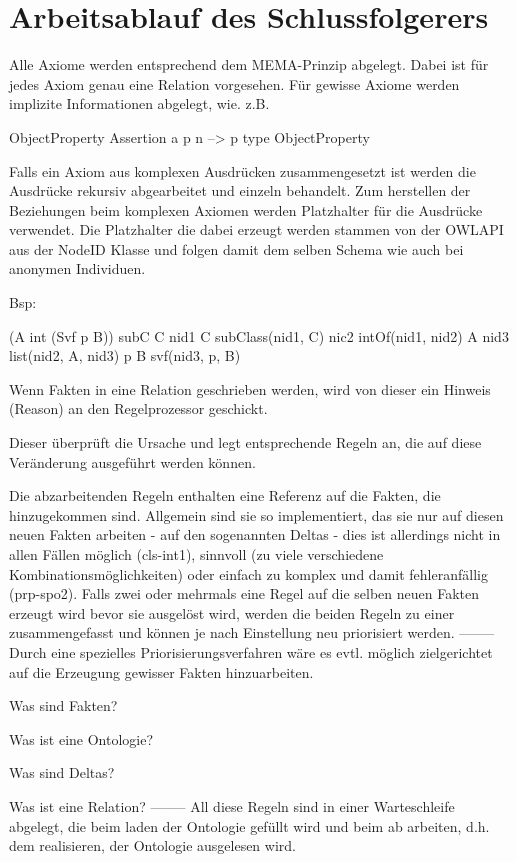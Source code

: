 \section{Arbeitsablauf des Schlussfolgerers}
Alle Axiome werden entsprechend dem MEMA-Prinzip abgelegt. Dabei ist für jedes Axiom genau eine Relation vorgesehen. Für gewisse Axiome werden implizite Informationen abgelegt, wie. z.B.

ObjectProperty Assertion a p n --> p type ObjectProperty

Falls ein Axiom aus komplexen Ausdrücken zusammengesetzt ist werden die Ausdrücke rekursiv abgearbeitet und einzeln behandelt. Zum herstellen der Beziehungen beim komplexen Axiomen werden Platzhalter für die Ausdrücke verwendet. Die Platzhalter die dabei erzeugt werden stammen von der OWLAPI aus der NodeID Klasse und folgen damit dem selben Schema wie auch bei anonymen Individuen.

Bsp:

(A int (Svf p B)) subC C
      nid1             C    subClass(nid1, C)
      nic2                  intOf(nid1, nid2)
 A         nid3             list(nid2, A, nid3)
            p B             svf(nid3, p, B)


Wenn Fakten in eine Relation geschrieben werden, wird von dieser ein Hinweis (Reason) an den Regelprozessor geschickt.

Dieser überprüft die Ursache und legt entsprechende Regeln an, die auf diese Veränderung ausgeführt werden können.

Die abzarbeitenden Regeln enthalten eine Referenz auf die Fakten, die hinzugekommen sind. Allgemein sind sie so implementiert, das sie nur auf diesen neuen Fakten arbeiten -  auf den sogenannten Deltas - dies ist allerdings nicht in allen Fällen möglich (cls-int1), sinnvoll (zu viele verschiedene Kombinationsmöglichkeiten) oder einfach zu komplex und damit fehleranfällig (prp-spo2). Falls zwei oder mehrmals eine Regel auf die selben neuen Fakten erzeugt wird bevor sie ausgelöst wird, werden die beiden Regeln zu einer zusammengefasst und können je nach Einstellung neu priorisiert werden.
--------
Durch eine spezielles Priorisierungsverfahren wäre es evtl. möglich zielgerichtet auf die Erzeugung gewisser Fakten hinzuarbeiten.

Was sind Fakten?

Was ist eine Ontologie?

Was sind Deltas?

Was ist eine Relation?
--------
All diese Regeln sind in einer Warteschleife abgelegt, die beim laden der Ontologie gefüllt wird und beim ab arbeiten, d.h. dem realisieren, der Ontologie ausgelesen wird.

